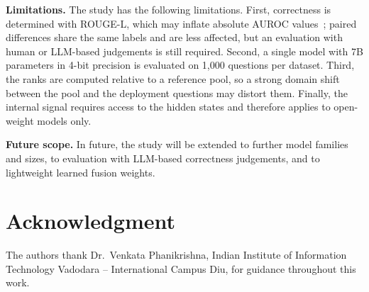 \documentclass[conference]{IEEEtran}
\begin{document}
\textbf{Limitations.} The study has the following limitations. First, correctness is determined with ROUGE-L, which may inflate absolute AUROC values~\cite{janiak2025}; paired differences share the same labels and are less affected, but an evaluation with human or LLM-based judgements is still required. Second, a single model with 7B parameters in 4-bit precision is evaluated on 1,000 questions per dataset. Third, the ranks are computed relative to a reference pool, so a strong domain shift between the pool and the deployment questions may distort them. Finally, the internal signal requires access to the hidden states and therefore applies to open-weight models only.

\textbf{Future scope.} In future, the study will be extended to further model families and sizes, to evaluation with LLM-based correctness judgements, and to lightweight learned fusion weights.

\section*{Acknowledgment}
The authors thank Dr.~Venkata Phanikrishna, Indian Institute of Information Technology Vadodara -- International Campus Diu, for guidance throughout this work.
\end{document}
